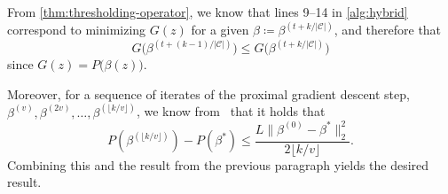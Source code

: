 From \cref{thm:thresholding-operator}, we know that lines 9--14 in \cref{alg:hybrid} correspond to minimizing \(G(z)\) for a given \(\beta \coloneqq \beta^{(t + k / |\mathcal{C}|)}\), and therefore that
\[
  G\big(\beta^{(t + (k - 1) / |\mathcal{C}|)}\big) \leq G\big(\beta^{(t + k / |\mathcal{C}|)}\big)
\]
since \(G(z) = P\big(\beta(z)\big)\).

Moreover, for a sequence of iterates of the proximal gradient descent step,
\(\beta^{(v)}, \beta^{(2v)}, \dots, \beta^{(\lfloor k / v \rfloor)}\),
we know from~\textcite[Theorem 3.1]{beck2009} that it holds that
\[
  P(\beta^{(\lfloor k / v \rfloor)}) - P(\beta^*)
  \leq \frac{L \lVert \beta^{(0)} - \beta^* \rVert_2^2}{2\lfloor k / v \rfloor}.
\]
Combining this and the result from the previous paragraph yields the desired
result.
